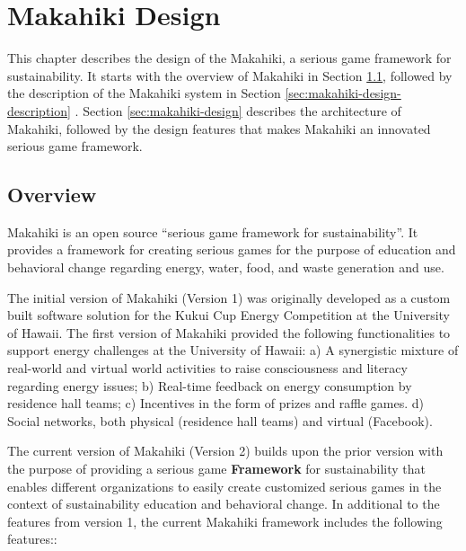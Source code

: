 \chapter{Makahiki Design}
\label{cha:makahiki-design}

This chapter describes the design of the Makahiki, a serious game framework for sustainability. It starts with the overview of Makahiki in Section \ref{sec:makahiki-design-overview}, followed by the description of the Makahiki system in Section \ref{sec:makahiki-design-description}
. Section \ref{sec:makahiki-design}
 describes the architecture of Makahiki, followed by the design features that makes Makahiki an innovated serious game framework.

\section{Overview}
\label{sec:makahiki-design-overview}

Makahiki is an open source ``serious game framework for sustainability''. It provides a framework for creating serious games for the purpose of education and behavioral change regarding energy, water, food, and waste generation and use.

The initial version of Makahiki (Version 1) was originally developed as a custom built software solution \cite{csdl2-11-01} for the Kukui Cup Energy Competition \cite{csdl2-10-08} at the University of Hawaii. The first version of Makahiki provided the following functionalities to support energy challenges at the University of Hawaii: a) A synergistic mixture of real-world and virtual world activities to raise  consciousness and literacy regarding energy issues; b) Real-time feedback on energy consumption by residence hall teams; c) Incentives in the form of prizes and raffle games. d) Social networks, both physical (residence hall teams) and virtual (Facebook).

The current version of Makahiki (Version 2) builds upon the prior version with the purpose of providing a serious game {\bf Framework} for sustainability that enables different organizations to easily create customized serious games in the context of sustainability education and behavioral change. In additional to the features from version 1, the current Makahiki framework includes the following features::

